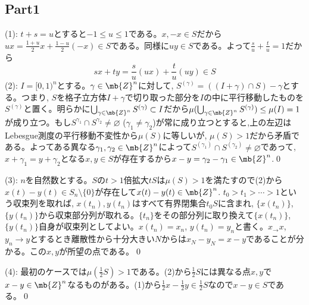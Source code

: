 \subsection{Part1}
\begin{probans}
(1): $t+s = u$とすると$-1\leq u\leq 1$である。$x,-x\in S$だから$ux = \frac{1+u}{2}{x} + \frac{1-u}{2}(-x)\in S$である。同様に$uy\in S$である。よって$\frac{s}{u} + \frac{t}{u} = 1$だから
\[sx + ty = \frac{s}{u}(ux) + \frac{t}{u}(uy) \in S\]
(2): $I=[0,1)^{n}$とする。$\gamma\in \mb{Z}^{n}$に対して, $S^{(\gamma)} = ((I+\gamma) \cap S) - \gamma$とする。つまり, $S$を格子立方体$I+\gamma$で切り取った部分を$I$の中に平行移動したものを$S^{(\gamma)}$と置く。明らかに$\bigcup_{\gamma\in \mb{Z}^{n}} S^{(\gamma)} \subset I$だから$\mu(\bigcup_{\gamma\in \mb{Z}^{n}}S^{(\gamma)}) \leq \mu(I) = 1$が成り立つ。もし$S^{\gamma_1} \cap S^{\gamma_2}\neq \varnothing$ ($\gamma_1\neq \gamma_2$)が常に成り立つとすると,上の左辺はLebesgue測度の平行移動不変性から$\mu(S)$に等しいが, $\mu(S) > 1$だから矛盾である。よってある異なる$\gamma_1,\gamma_2\in \mb{Z}^{n}$によって$S^{(\gamma_1)} \cap S^{(\gamma_2)} \neq \varnothing$であって, $x+\gamma_1 = y+\gamma_2$となる$x,y\in S$が存在するから$x-y = \gamma_2 - \gamma_1\in \mb{Z}^{n}$.\qed

(3): $n$を自然数とする。$S$の$t>1$倍拡大$tS$は$\mu(S) > 1$を満たすので(2)から$x(t) - y(t) \in S_n\setminus\{ 0 \}$が存在して$x(t)-y(t) \in \mb{Z}^{n}$. $t_0 > t_1 > \cdots  > 1$という収束列を取れば,  $x(t_n),y(t_n)$はすべて有界閉集合$t_0S$に含まれ, $\{ x(t_n) \}$, $\{ y(t_n)\}$から収束部分列が取れる。$\{ t_n \}$をその部分列に取り換えて$\{ x(t_n)\}$, $\{ y(t_n)\}$自身が収束列としてよい。$x(t_n) = x_n$, $y(t_n) = y_n$と書く。$x_\to x$, $y_n\to y$とするとき離散性から十分大きい$N$からは$x_{N} - y_{N} = x-y$であることが分かる。この$x,y$が所望の点である。\qed

(4): 最初のケースでは$\mu(\frac{1}{2} S) > 1$である。(2)から$\frac{1}{2}S$には異なる点$x,y$で$x-y\in \mb{Z}^{n}$なるものがある。(1)から$\frac{1}{2} x - \frac{1}{2}y\in \frac{1}{2}S$なので$x-y\in S$である。\qed

\end{probans}







